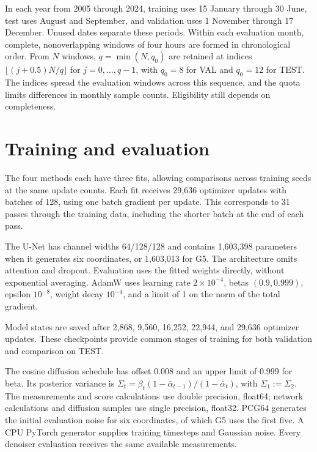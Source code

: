 \documentclass{article}
\begin{document}
In each year from 2005 through 2024, training uses 15 January through 30 June, test uses August and September, and validation uses 1 November through 17 December. Unused dates separate these periods. Within each evaluation month, complete, nonoverlapping windows of four hours are formed in chronological order. From $N$ windows, $q=\min(N,q_0)$ are retained at indices $\lfloor(j+0.5)N/q\rfloor$ for $j=0,\ldots,q-1$, with $q_0=8$ for VAL and $q_0=12$ for TEST. The indices spread the evaluation windows across this sequence, and the quota limits differences in monthly sample counts. Eligibility still depends on completeness.

\section{Training and evaluation}
\label{app:protocol}

The four methods each have three fits, allowing comparisons across training seeds at the same update counts. Each fit receives 29{,}636 optimizer updates with batches of 128, using one batch gradient per update. This corresponds to 31 passes through the training data, including the shorter batch at the end of each pass.

The U-Net has channel widths 64/128/128 and contains 1{,}603{,}398 parameters when it generates six coordinates, or 1{,}603{,}013 for G5. The architecture omits attention and dropout. Evaluation uses the fitted weights directly, without exponential averaging. AdamW uses learning rate $2\times10^{-4}$, betas $(0.9,0.999)$, epsilon $10^{-8}$, weight decay $10^{-4}$, and a limit of 1 on the norm of the total gradient.

Model states are saved after 2{,}868, 9{,}560, 16{,}252, 22{,}944, and 29{,}636 optimizer updates. These checkpoints provide common stages of training for both validation and comparison on TEST.

The cosine diffusion schedule has offset 0.008 and an upper limit of 0.999 for beta. Its posterior variance is $\Sigma_t=\beta_t(1-\bar\alpha_{t-1})/(1-\bar\alpha_t)$, with $\Sigma_1:=\Sigma_2$. The measurements and score calculations use double precision, float64; network calculations and diffusion samples use single precision, float32. PCG64 generates the initial evaluation noise for six coordinates, of which G5 uses the first five. A CPU PyTorch generator supplies training timesteps and Gaussian noise. Every denoiser evaluation receives the same available measurements.
\end{document}
